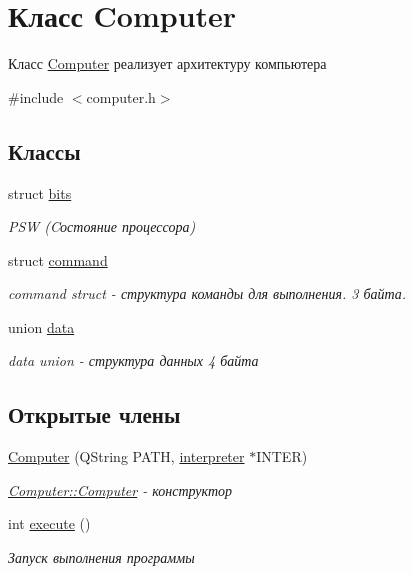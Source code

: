 \hypertarget{class_computer}{}\section{Класс Computer}
\label{class_computer}


Класс \hyperlink{class_computer}{Computer} реализует архитектуру компьютера  




{\ttfamily \#include $<$computer.\+h$>$}

\subsection*{Классы}
\begin{DoxyCompactItemize}
\item 
struct \hyperlink{struct_computer_1_1bits}{bits}
\begin{DoxyCompactList}\small\item\em P\+SW (Cостояние процессора) \end{DoxyCompactList}\item 
struct \hyperlink{struct_computer_1_1command}{command}
\begin{DoxyCompactList}\small\item\em command struct -\/ структура команды для выполнения. 3 байта. \end{DoxyCompactList}\item 
union \hyperlink{union_computer_1_1data}{data}
\begin{DoxyCompactList}\small\item\em data union -\/ структура данных 4 байта \end{DoxyCompactList}\end{DoxyCompactItemize}
\subsection*{Открытые члены}
\begin{DoxyCompactItemize}
\item 
\hyperlink{class_computer_ae13c32fa07ad956f0c229608dab5e332}{Computer} (Q\+String P\+A\+TH, \hyperlink{classinterpreter}{interpreter} $\ast$I\+N\+T\+ER)
\begin{DoxyCompactList}\small\item\em \hyperlink{class_computer_ae13c32fa07ad956f0c229608dab5e332}{Computer\+::\+Computer} -\/ конструктор \end{DoxyCompactList}\item 
int \hyperlink{class_computer_a4303af6a549fc8f792de0d2d18a9e05f}{execute} ()
\begin{DoxyCompactList}\small\item\em Запуск выполнения программы \end{DoxyCompactList}\end{DoxyCompactItemize}
